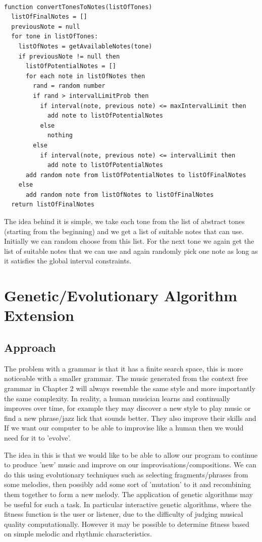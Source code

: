 \documentclass[pdftex,12pt,a4paper]{report}
\begin{document}
\begin{verbatim}

function convertTonesToNotes(listOfTones)
  listOfFinalNotes = []
  previousNote = null
  for tone in listOfTones:
    listOfNotes = getAvailableNotes(tone)
    if previousNote != null then
      listOfPotentialNotes = []
      for each note in listOfNotes then
        rand = random number
        if rand > intervalLimitProb then
          if interval(note, previous note) <= maxIntervalLimit then
            add note to listOfPotentialNotes
          else
            nothing
        else
          if interval(note, previous note) <= intervalLimit then
            add note to listOfPotentialNotes
      add random note from listOfPotentialNotes to listOfFinalNotes
    else
      add random note from listOfNotes to listOfFinalNotes
  return listOfFinalNotes

\end{verbatim}

The idea behind it is simple, we take each tone from the list of abstract tones (starting from the beginning) and we get a list of suitable notes that can use. Initially we can random choose from this list. For the next tone we again get the list of suitable notes that we can use and again randomly pick one note as long as it satisfies the global interval constraints.


\chapter{Genetic/Evolutionary Algorithm Extension}

\section{Approach}
The problem with a grammar is that it has a finite search space, this is more noticeable with a smaller grammar. The music generated from the context free grammar in Chapter 2 will always resemble the same style and more importantly the same complexity. In reality, a human musician learns and continually improves over time, for example they may discover a new style to play music or find a new phrase/jazz lick that sounds better. They also improve their skills and  If we want our computer to be able to improvise like a human then we would need for it to 'evolve'.

The idea in this is that we would like to be able to allow our program to continue to produce 'new' music and improve on our improvisations/compositions. We can do this using evolutionary techniques such as selecting fragments/phrases from some melodies, then possibly add some sort of 'mutation' to it and recombining them together to form a new melody. The application of genetic algorithms may be useful for such a task. In particular interactive genetic algorithms, where the fitness function is the user or listener, due to the difficulty of judging musical quality computationally. However it may be possible to determine fitness based on simple melodic and rhythmic characteristics. 
\end{document}
